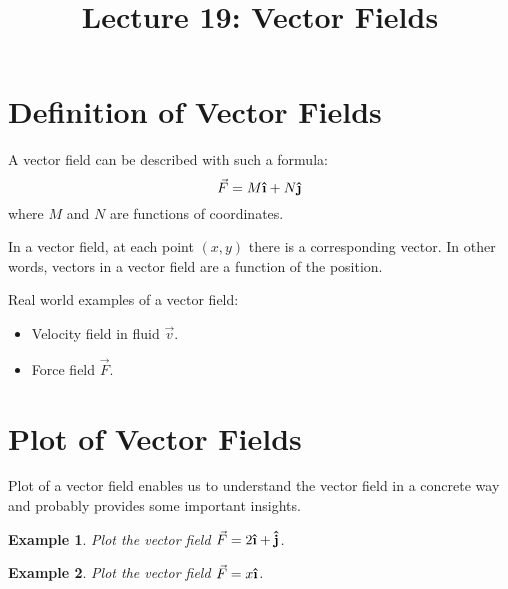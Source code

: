 \documentclass{article}
\title{Lecture 19: Vector Fields}
\author{}
\date{}
\newtheorem{example}{Example}
\newcommand{\uvec}[1]{\boldsymbol{\hat{\textbf{#1}}}}
\begin{document}
    
\maketitle

\section{Definition of Vector Fields}

A vector field can be described with such a formula:
\begin{equation*}
  \vec{F} = M \uvec{\i} + N \uvec{\j}
\end{equation*}
where $M$ and $N$ are functions of coordinates.

In a vector field, at each point $(x, y)$ there is a corresponding vector. In 
other words, vectors in a vector field are a function of the position.

Real world examples of a vector field:
\begin{itemize}
  \item Velocity field in fluid $\vec{v}$.
  \item Force field $\vec{F}$.
\end{itemize}

\section{Plot of Vector Fields}

Plot of a vector field enables us to understand the vector field in a concrete 
way and probably provides some important insights.

\begin{example}
  Plot the vector field $\vec{F} = 2 \uvec{\i} + \uvec{j}$.
\end{example}

\begin{example}
  Plot the vector field $\vec{F} = x \uvec{\i}$.
\end{example}
\end{document}
